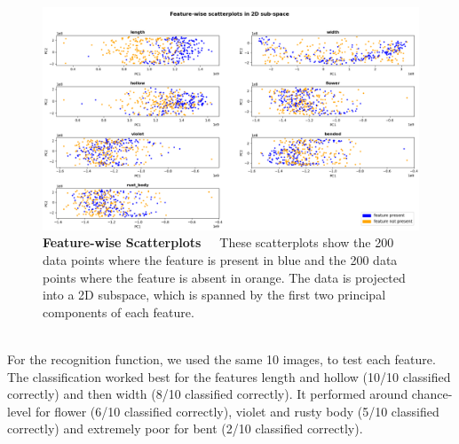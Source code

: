 \begin{figure}[h]
	\centering
	\includegraphics[scale=0.35]{Figures/chapter04/pca_scatterplot}
	\decoRule
	\caption[Feature-wise Scatterplots]{\textbf{Feature-wise Scatterplots}~~~These scatterplots show the 200 data points where the feature is present in blue and the 200 data points where the feature is absent in orange. The data is projected into a 2D subspace, which is  spanned by the first two principal components of each feature. }
	\label{fig:PCAscatter}
\end{figure}
\\
For the recognition function, we used the same 10 images, to test each feature. The classification worked best for the features length and hollow (10/10 classified correctly) and then width (8/10 classified correctly). It performed around chance-level for flower (6/10 classified correctly), violet and rusty body (5/10 classified correctly) and extremely poor for bent (2/10 classified correctly).   \\
\\
 
